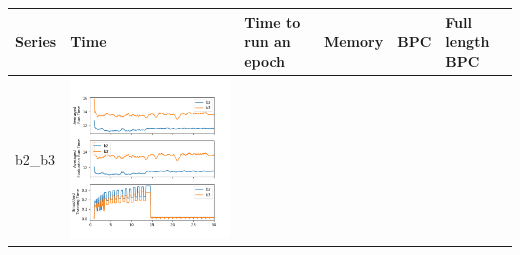 \begin{longtable}[]{@{}llllll@{}}
\toprule
Series & Time & Time to run an epoch & Memory & BPC & Full length
BPC\tabularnewline
\midrule
\endhead
b2\_b3 & \includegraphics{b2_b3_time.png} &

\end{longtable}
